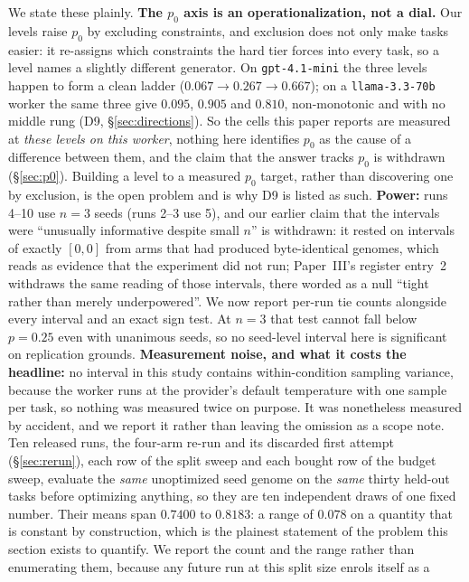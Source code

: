 \documentclass[11pt]{article}
\begin{document}
We state these plainly. \textbf{The $p_0$ axis is an operationalization, not a dial.} Our levels
raise $p_0$ by excluding constraints, and exclusion does not only make tasks easier: it re-assigns
which constraints the hard tier forces into every task, so a level names a slightly different
generator. On \texttt{gpt-4.1-mini} the three levels happen to form a clean ladder
($0.067 \to 0.267 \to 0.667$); on a \texttt{llama-3.3-70b} worker the same three give
$0.095$, $0.905$ and $0.810$, non-monotonic and with no middle rung (D9,
\S\ref{sec:directions}). So the cells this paper reports are measured at \emph{these levels on
this worker}, nothing here identifies $p_0$ as the cause of a difference between them, and the
claim that the answer tracks $p_0$ is withdrawn (\S\ref{sec:p0}). Building a level to a measured $p_0$
target, rather than discovering one by exclusion, is the open problem and is why D9 is listed as
such. \textbf{Power:} runs 4--10 use $n{=}3$ seeds (runs 2--3 use 5), and
our earlier claim that the intervals were ``unusually informative despite small $n$'' is
withdrawn: it rested on intervals of exactly $[0,0]$ from arms that had produced byte-identical
genomes, which reads as evidence that the experiment did not run; Paper~III's register
entry~2 withdraws the same reading of those intervals, there worded as a null ``tight rather than
merely underpowered''.
We now report per-run tie counts alongside every
interval and an exact sign test. At $n{=}3$ that test cannot fall below $p=0.25$ even with
unanimous seeds, so no seed-level interval here is significant on replication grounds.
\textbf{Measurement noise, and
what it costs the headline:} no interval in this study contains within-condition sampling
variance, because the worker runs at the provider's default temperature with one sample per
task, so nothing was measured twice on purpose. It was nonetheless measured by accident, and we
report it rather than leaving the omission as a scope note. Ten released runs, the four-arm
re-run and its discarded first attempt (\S\ref{sec:rerun}), each row of the split sweep and
each bought row of the budget sweep, evaluate the
\emph{same} unoptimized seed genome on the \emph{same} thirty held-out tasks before optimizing
anything, so they are ten independent draws of one fixed number. Their means span $0.7400$ to
$0.8183$: a range of $0.078$ on a quantity that is constant by construction, which is the
plainest statement of the problem this section exists to quantify. We report the count and the
range rather than enumerating them, because any future run at this split size enrols itself as a
\end{document}
